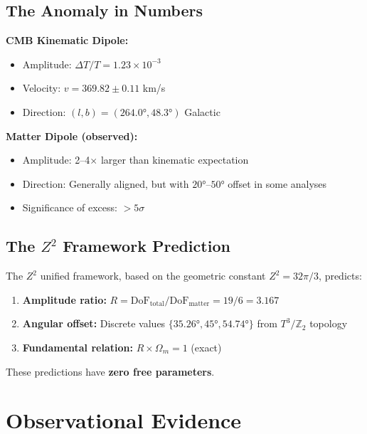 \documentclass[12pt,a4paper]{article}
\begin{document}
\subsection{The Anomaly in Numbers}

\textbf{CMB Kinematic Dipole:}
\begin{itemize}
    \item Amplitude: $\Delta T/T = 1.23 \times 10^{-3}$
    \item Velocity: $v = 369.82 \pm 0.11$ km/s
    \item Direction: $(l, b) = (264.0°, 48.3°)$ Galactic
\end{itemize}

\textbf{Matter Dipole (observed):}
\begin{itemize}
    \item Amplitude: 2--4$\times$ larger than kinematic expectation
    \item Direction: Generally aligned, but with $20°$--$50°$ offset in some analyses
    \item Significance of excess: $>5\sigma$
\end{itemize}

\subsection{The $Z^2$ Framework Prediction}

The $Z^2$ unified framework, based on the geometric constant $Z^2 = 32\pi/3$, predicts:

\begin{enumerate}
    \item \textbf{Amplitude ratio:} $R = \text{DoF}_{\text{total}} / \text{DoF}_{\text{matter}} = 19/6 = 3.167$
    \item \textbf{Angular offset:} Discrete values $\{35.26°, 45°, 54.74°\}$ from $T^3/\mathbb{Z}_2$ topology
    \item \textbf{Fundamental relation:} $R \times \Omega_m = 1$ (exact)
\end{enumerate}

These predictions have \textbf{zero free parameters}.

\section{Observational Evidence}
\end{document}
